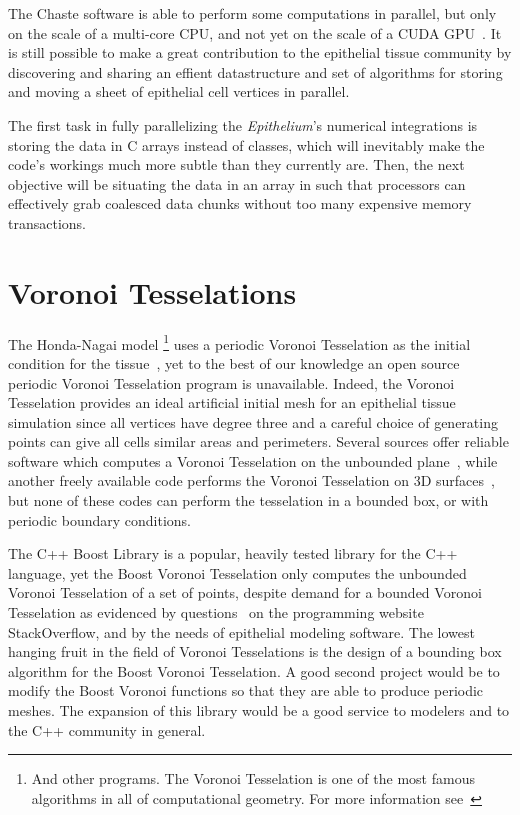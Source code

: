The Chaste software is able to perform some computations in parallel, but only on the scale of a multi-core CPU, and not yet on the scale of a CUDA GPU~\cite{ChasteTutorial}. It is still possible to make a great contribution to the epithelial tissue community by discovering and sharing an effient datastructure and set of algorithms for storing and moving a sheet of epithelial cell vertices in parallel.

The first task in fully parallelizing the \emph{Epithelium}'s numerical integrations is storing the data in C arrays instead of classes, which will inevitably make the code's workings much more subtle than they currently are. Then, the next objective will be situating the data in an array in such that processors can effectively grab coalesced data chunks without too many expensive memory transactions. 

\section{Voronoi Tesselations}
The Honda-Nagai model \footnote{And other programs. The Voronoi Tesselation is one of the most famous algorithms in all of computational geometry. For more information see~\cite{tessel}} uses a periodic Voronoi Tesselation as the initial condition for the tissue~\cite{HondaNagai}, yet to the best of our knowledge an open source periodic Voronoi Tesselation program is unavailable. Indeed, the Voronoi Tesselation provides an ideal artificial initial mesh for an epithelial tissue simulation since all vertices have degree three and a careful choice of generating points can give all cells similar areas and perimeters. Several sources offer reliable software which computes a Voronoi Tesselation on the unbounded plane~\cite{boost, triangle}, while another freely available code performs the Voronoi Tesselation on 3D surfaces~\cite{voro++}, but none of these codes can perform the tesselation in a bounded box, or with periodic boundary conditions. 

The C++ Boost Library is a popular, heavily tested library for the C++ language, yet the Boost Voronoi Tesselation only computes the unbounded Voronoi Tesselation of a set of points, despite demand for a bounded Voronoi Tesselation as evidenced by questions~\cite{q1} on the programming website StackOverflow, and by the needs of epithelial modeling software. The lowest hanging fruit in the field of Voronoi Tesselations is the design of a bounding box algorithm for the Boost Voronoi Tesselation. A good second project would be to modify the Boost Voronoi functions so that they are able to produce periodic meshes. The expansion of this library would be a good service to modelers and to the C++ community in general.

